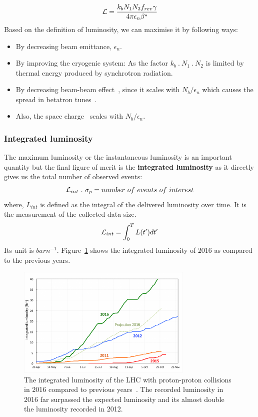 {{{\begin{equation}\label{eq:luminosity2}
    \mathcal{L} = \frac{k_bN_1N_2f_{rev}\gamma}{4 \pi \epsilon_n \beta^*}
\end{equation}
Based on the definition of luminosity, we can maximise it by following ways:
\begin{itemize}
    \item By decreasing beam emittance, $\epsilon_n$.
    \item By improving the cryogenic system: As the factor $k_b~.~N_1~.~N_2$ is limited by thermal energy produced by synchrotron radiation.
    \item By decreasing beam-beam effect~\cite{Herr2014,Papotti2014}, since it scales with $N_b/ \epsilon_n$ which causes the spread in betatron tunes~\cite{Dubouchet2013}.
    \item Also, the space charge~\cite{Oeftiger2016} scales with $N_b/ \epsilon_n$.
\end{itemize}

\subsubsection{Integrated luminosity} %
\label{ssub:integrated_luminosity}
The maximum luminosity or the instantaneous luminosity is an important quantity but the final figure of merit is the \textbf{integrated luminosity} as it directly gives us the total number of observed events:
\begin{equation}
	\mathcal{L}_{int}~.~\sigma_p = number~of~events~of~interest
\end{equation}
where, $L_{int}$ is defined as the integral of the delivered luminosity over time. It is the measurement of the collected data size.
\begin{equation}
	\mathcal{L}_{int} = \int_0^T L(t')dt'
\end{equation}
Its unit is $barn^{-1}$. Figure~\ref{fig:lumi-proj-2016-final-v2} shows the integrated luminosity of 2016 as compared to the previous years.
\begin{figure}[!htbp]
	\centering
	\includegraphics[width=0.75\textwidth]{figures/lumi-proj-2016-final-v2.png}
	\caption{The integrated luminosity of the LHC with proton-proton collisions in 2016 compared to previous years~\cite{Pralavorio2016}. The recorded luminosity in 2016 far surpassed the expected luminosity and its almost double the luminosity recorded in 2012.}
	\label{fig:lumi-proj-2016-final-v2}
\end{figure}

}}}
